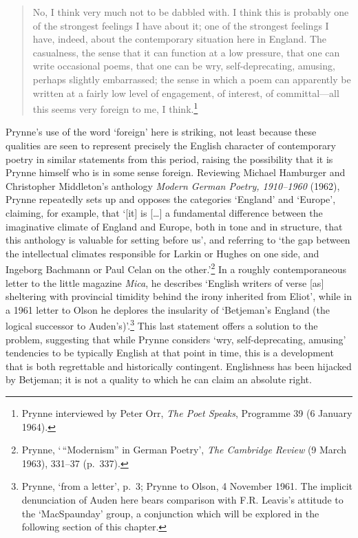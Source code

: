 \documentclass[]{article}
\begin{document}
\begin{quote}
No, I think very much not to be dabbled with. I think this is probably
one of the strongest feelings I have about it; one of the strongest
feelings I have, indeed, about the contemporary situation here in
England. The casualness, the sense that it can function at a low
pressure, that one can write occasional poems, that one can be wry,
self-deprecating, amusing, perhaps slightly embarrassed; the sense in
which a poem can apparently be written at a fairly low level of
engagement, of interest, of committal---all this seems very foreign to
me, I think.\footnote{Prynne interviewed by Peter Orr, \emph{The Poet
  Speaks}, Programme 39 (6 January 1964).}
\end{quote}

\noindent Prynne's use of the word `foreign' here is striking, not least
because these qualities are seen to represent precisely the English
character of contemporary poetry in similar statements from this period,
raising the possibility that it is Prynne himself who is in some sense
foreign. Reviewing Michael Hamburger and Christopher Middleton's
anthology \emph{Modern German Poetry, 1910--1960} (1962), Prynne
repeatedly sets up and opposes the categories `England' and `Europe',
claiming, for example, that `{[}it{]} is {[}\ldots{}{]} a fundamental
difference between the imaginative climate of England and Europe, both
in tone and in structure, that this anthology is valuable for setting
before us', and referring to `the gap between the intellectual climates
responsible for Larkin or Hughes on one side, and Ingeborg Bachmann or
Paul Celan on the other.'\footnote{Prynne, `\,``Modernism'' in German
  Poetry', \emph{The Cambridge Review} (9 March 1963), 331--37 (p.~337).}
In a roughly contemporaneous letter to the little magazine \emph{Mica},
he describes `English writers of verse {[}as{]} sheltering with
provincial timidity behind the irony inherited from Eliot', while in a
1961 letter to Olson he deplores the insularity of `Betjeman's England
(the logical successor to Auden's)'.\footnote{Prynne, `from a letter',
  p.~3; Prynne to Olson, 4 November 1961. The implicit denunciation of
  Auden here bears comparison with F.R. Leavis's attitude to the
  `MacSpaunday' group, a conjunction which will be explored in the
  following section of this chapter.} This last statement offers a
solution to the problem, suggesting that while Prynne considers `wry,
self-deprecating, amusing' tendencies to be typically English at that
point in time, this is a development that is both regrettable and
historically contingent. Englishness has been hijacked by Betjeman; it
is not a quality to which he can claim an absolute right.
\end{document}
